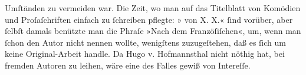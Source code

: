 \begin{ledgroupsized}[t]{13cm}
{{                  Umſtänden zu vermeiden war. Die Zeit, wo man auf das Titelblatt von Komödien und
                  Proſaſchriften einfach zu ſchreiben pflegte: » von X. X.« ſind vorüber, aber ſelbſt damals benützte man die
                  Phraſe »Nach dem Franzöſiſchen«, um, wenn man ſchon den Autor nicht nennen wollte,
                  wenigſtens zuzugeſtehen, daß es ſich um keine Original-Arbeit handle. Da Hugo v. Hofmannsthal nicht nöthig hat, bei
                  fremden Autoren zu leihen, wäre eine  des
                  Falles gewiß von Intereſſe.}}\pend
           
         
         \endnumbering{}\end{ledgroupsized}\begin{anhang}\end{anhang}\newcommand{\dateiname}{L02941}\newcommand{\titel}{Paul Goldmann an Arthur Schnitzler, 1. 12. [1900]}\newcommand{\editorInnen}{Martin Anton Müller und Laura Untner}
      